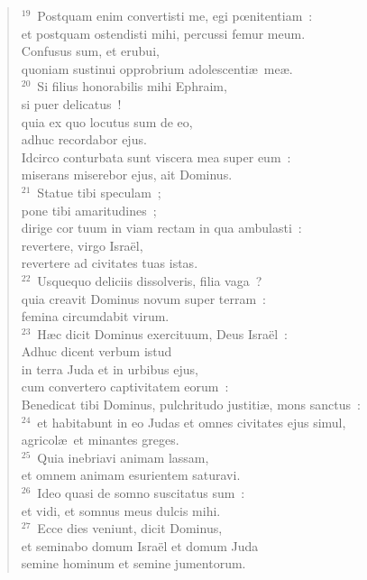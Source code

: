 \begin{verse}
${}^{19}$~Postquam enim convertisti me, egi pœnitentiam~:\\ et postquam ostendisti mihi, percussi femur meum.\\ Confusus sum, et erubui,\\ quoniam sustinui opprobrium adolescenti\ae\ me\ae .\\
${}^{20}$~Si filius honorabilis mihi Ephraim,\\ si puer delicatus~!\\ quia ex quo locutus sum de eo,\\ adhuc recordabor ejus.\\ Idcirco conturbata sunt viscera mea super eum~:\\ miserans miserebor ejus, ait Dominus.\\
${}^{21}$~Statue tibi speculam~;\\ pone tibi amaritudines~;\\ dirige cor tuum in viam rectam in qua ambulasti~:\\ revertere, virgo Isra\"el,\\ revertere ad civitates tuas istas.\\
${}^{22}$~Usquequo deliciis dissolveris, filia vaga~?\\ quia creavit Dominus novum super terram~:\\ femina circumdabit virum.\\
${}^{23}$~H\ae c dicit Dominus exercituum, Deus Isra\"el~:\\ Adhuc dicent verbum istud\\ in terra Juda et in urbibus ejus,\\ cum convertero captivitatem eorum~:\\ Benedicat tibi Dominus, pulchritudo justiti\ae , mons sanctus~:\\
${}^{24}$~et habitabunt in eo Judas et omnes civitates ejus simul,\\ agricol\ae\ et minantes greges.\\
${}^{25}$~Quia inebriavi animam lassam,\\ et omnem animam esurientem saturavi.\\
${}^{26}$~Ideo quasi de somno suscitatus sum~:\\ et vidi, et somnus meus dulcis mihi.\\
${}^{27}$~Ecce dies veniunt, dicit Dominus,\\ et seminabo domum Isra\"el et domum Juda\\ semine hominum et semine jumentorum.\\

\end{verse}
